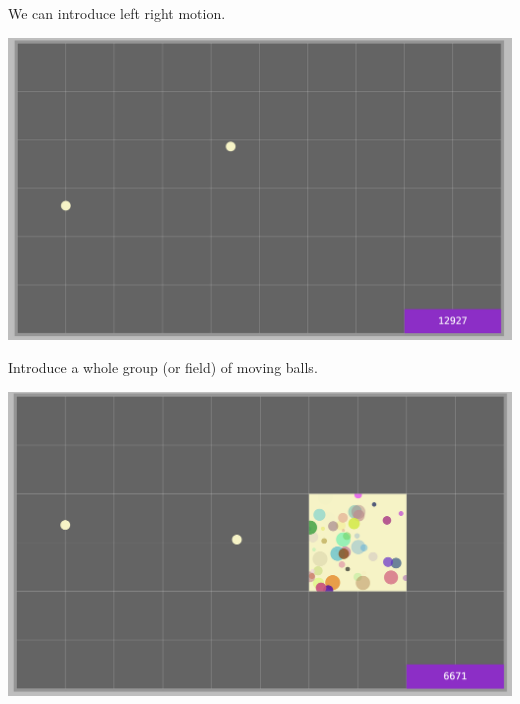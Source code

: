 \documentclass[a4paper,12pt]{article}
\begin{document}
\newpage
We can introduce left right motion.

\begin{center}
	\includegraphics[width=18cm, angle=0, origin=c,]{animation_frame_interpolation/updownlefttright.png}
\end{center}
\newpage
Introduce a whole group (or field) of moving balls.\\

\begin{center}
	\includegraphics[width=18cm, angle=0, origin=c,]{animation_frame_interpolation/withgroup.png}
\end{center}
\newpage
\end{document}
